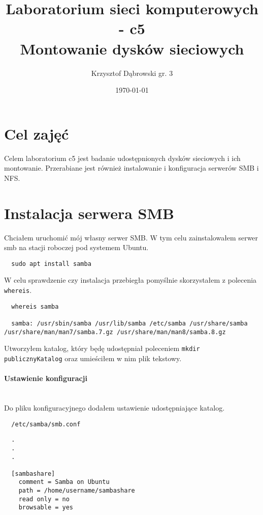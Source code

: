 \documentclass{article} %
\title{Laboratorium sieci komputerowych - c5 \\ Montowanie dysków sieciowych}
\author{Krzysztof Dąbrowski gr. 3}
\date{\today}
\begin{document}
\maketitle{}
\tableofcontents{}

\section{Cel zajęć}
Celem laboratorium c5 jest badanie udostępnionych dysków sieciowych i ich montowanie.
Przerabiane jest również instalowanie i konfiguracja serwerów SMB i NFS.

\section{Instalacja serwera SMB}
Chciałem uruchomić mój własny serwer SMB. W tym celu zainstalowałem serwer smb na stacji roboczej pod systemem Ubuntu.

\begin{verbatim}
  sudo apt install samba
\end{verbatim}

W celu sprawdzenie czy instalacja przebiegła pomyślnie skorzystałem z polecenia \texttt{whereis}.
\begin{verbatim}
  whereis samba

  samba: /usr/sbin/samba /usr/lib/samba /etc/samba /usr/share/samba /usr/share/man/man7/samba.7.gz /usr/share/man/man8/samba.8.gz
\end{verbatim}

Utworzyłem katalog, który będę udostępniał poleceniem \texttt{mkdir publicznyKatalog} oraz umieściłem w nim plik tekstowy.

\paragraph{Ustawienie konfiguracji} \mbox{} \\
Do pliku konfiguracyjnego dodałem ustawienie udostępniające katalog.

\begin{tcolorbox}[colback=yellow!10!white,colframe=red!45!black,coltitle=yellow!100!black, title=Konfiguracja serwera SMB]
  \begin{lstlisting}
  /etc/samba/smb.conf
  \end{lstlisting}
  \tcblower
  \footnotesize
  \begin{lstlisting}
  .
  .
  .

  [sambashare]
    comment = Samba on Ubuntu
    path = /home/username/sambashare
    read only = no
    browsable = yes 
  \end{lstlisting}
\end{tcolorbox}
\normalsize
\end{document}
